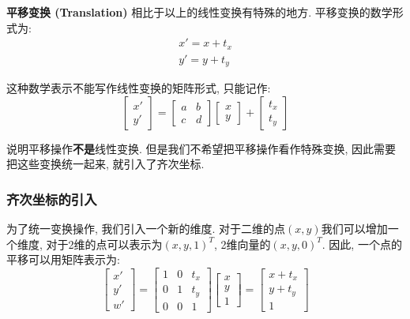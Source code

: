 \documentclass[openany]{progbookcn}
\begin{document}
\textbf{平移变换 (Translation) }相比于以上的线性变换有特殊的地方. 平移变换的数学形式为: 
\begin{equation}
	\begin{split}
		x'=x+t_x\\
		y'=y+t_y
	\end{split}
\end{equation}

这种数学表示不能写作线性变换的矩阵形式, 只能记作: 
\begin{equation}
	\begin{bmatrix}x'\\y'\end{bmatrix}=\begin{bmatrix}a&b\\c&d\end{bmatrix}\begin{bmatrix}x\\y\end{bmatrix}+\begin{bmatrix}t_x\\t_y\end{bmatrix}
\end{equation}

说明平移操作\textbf{不是}线性变换. 但是我们不希望把平移操作看作特殊变换, 因此需要把这些变换统一起来, 就引入了齐次坐标. 

\subsubsection{齐次坐标的引入}

为了统一变换操作, 我们引入一个新的维度. 对于二维的点$(x,y)$我们可以增加一个维度, 对于2维的点可以表示为$(x,y,1)^T$, 2维向量的$(x,y,0)^T$. 因此, 一个点的平移可以用矩阵表示为: 
\begin{equation}
	\begin{bmatrix}x'\\y'\\w'\end{bmatrix}=\begin{bmatrix}1&0&t_x\\0&1&t_y\\0&0&1\end{bmatrix}\begin{bmatrix}x\\y\\1\end{bmatrix}=\begin{bmatrix}x+t_x\\y+t_y\\1\end{bmatrix}
\end{equation}
\end{document}
